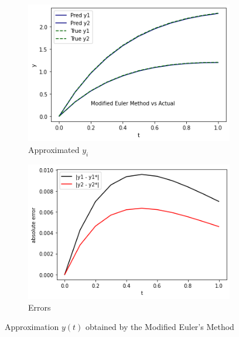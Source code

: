 \documentclass[12pt,oneside]{book}
\begin{document}
		\begin{figure}[h!]
			\centering
			\begin{subfigure}[h]{0.47\textwidth}
				\centering
				\includegraphics[width=\textwidth]{mod_euler}
				\caption{Approximated $ y_{i} $}
			\end{subfigure}
			\hfill
			\begin{subfigure}[h]{0.47\textwidth}
				\centering
				\includegraphics[width=\textwidth]{mod_euler_err}
				\caption{Errors}
			\end{subfigure}
			\caption{Approximation $ y(t) $ obtained by the Modified Euler's Method}
			\label{fig:modeuler}
		\end{figure}
	
\end{document}
